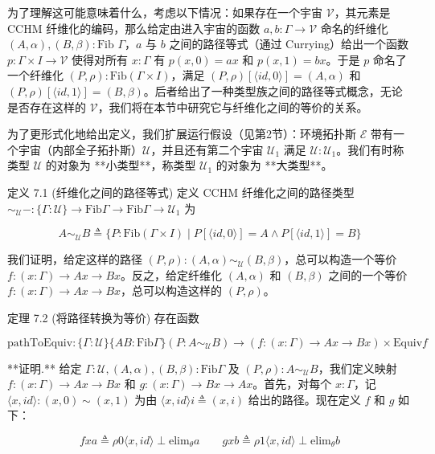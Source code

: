 \documentclass{ctexart}
\theoremstyle{plain}
\theoremstyle{definition}
\theoremstyle{definition}
\theoremstyle{definition}
\theoremstyle{definition}
\numberwithin{equation}{section}
\begin{document}
为了理解这可能意味着什么，考虑以下情况：如果存在一个宇宙 $\mathcal{V}$，其元素是 CCHM 纤维化的编码，那么给定由进入宇宙的函数 $a, b : \Gamma \to \mathcal{V}$ 命名的纤维化 $(A, \alpha), (B, \beta) : \text{Fib } \Gamma$，$a$ 与 $b$ 之间的路径等式（通过 Currying）给出一个函数 $p : \Gamma \times I \to \mathcal{V}$ 使得对所有 $x : \Gamma$ 有 $p(x, 0) = a x$ 和 $p(x, 1) = b x$。于是 $p$ 命名了一个纤维化 $(P, \rho) : \text{Fib}(\Gamma \times I)$，满足 $(P, \rho)[\langle id, 0 \rangle] = (A, \alpha)$ 和 $(P, \rho)[\langle id, 1 \rangle] = (B, \beta)$。后者给出了一种类型族之间的路径等式概念，无论是否存在这样的 $\mathcal{V}$，我们将在本节中研究它与纤维化之间的等价的关系。

为了更形式化地给出定义，我们扩展运行假设（见第2节）：环境拓扑斯 $\mathcal{E}$ 带有一个宇宙（内部全子拓扑斯）$\mathcal{U}$，并且还有第二个宇宙 $\mathcal{U}_1$ 满足 $\mathcal{U} : \mathcal{U}_1$。我们有时称类型 $\mathcal{U}$ 的对象为 **小类型**，称类型 $\mathcal{U}_1$ 的对象为 **大类型**。

定义 7.1 (纤维化之间的路径等式)
定义 CCHM 纤维化之间的路径类型 $\sim_{\mathcal{U}} - : \{ \Gamma : \mathcal{U} \} \to \text{Fib} \Gamma \to \text{Fib} \Gamma \to \mathcal{U}_1$ 为

\[A \sim_{\mathcal{U}} B \triangleq \{ P : \text{Fib}(\Gamma \times I) \mid P[\langle id, 0 \rangle] = A \land P[\langle id, 1 \rangle] = B \}\]

我们证明，给定这样的路径 $(P, \rho) : (A, \alpha) \sim_{\mathcal{U}} (B, \beta)$，总可以构造一个等价 $f : (x : \Gamma) \to A x \to B x$。反之，给定纤维化 $(A, \alpha)$ 和 $(B, \beta)$ 之间的一个等价 $f : (x : \Gamma) \to A x \to B x$，总可以构造这样的 $(P, \rho)$。

定理 7.2 (将路径转换为等价)
存在函数

\[\text{pathToEquiv} : \{ \Gamma : \mathcal{U} \} \{ A B : \text{Fib} \Gamma \} (P : A \sim_{\mathcal{U}} B) \to (f : (x : \Gamma) \to A x \to B x) \times \text{Equiv} f \tag{7.1}\]

**证明.** 给定 $\Gamma : \mathcal{U}, (A, \alpha), (B, \beta) : \text{Fib} \Gamma$ 及 $(P, \rho) : A \sim_{\mathcal{U}} B$，我们定义映射 $f : (x : \Gamma) \to A x \to B x$ 和 $g : (x : \Gamma) \to B x \to A x$。首先，对每个 $x : \Gamma$，记 $\langle x, id \rangle : (x, 0) \sim (x, 1)$ 为由 $\langle x, id \rangle i \triangleq (x, i)$ 给出的路径。现在定义 $f$ 和 $g$ 如下：

\[f x a \triangleq \rho 0 \langle x, id \rangle \perp \text{elim}_\theta a \qquad g x b \triangleq \rho 1 \langle x, id \rangle \perp \text{elim}_\theta b\]
\end{document}

